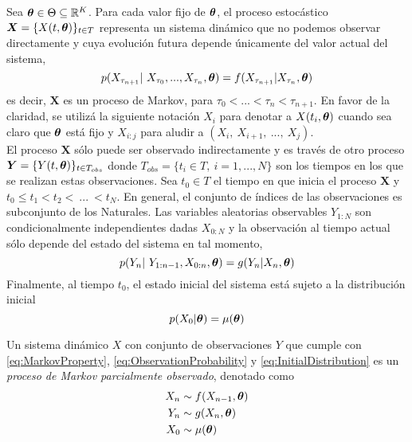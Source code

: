 Sea $\boldsymbol{\theta}\in\Theta\subseteq \mathbb R^K$. Para cada valor fijo de $\boldsymbol{\theta}$, el proceso estocástico $\boldsymbol{X} = \{X(t,\boldsymbol{\theta})\}_{t\in T}$ 
representa un sistema dinámico que no podemos observar directamente y cuya evolución futura depende únicamente del valor actual del sistema, 
\begin{equation}\label{eq:MarkovProperty}
    p(X_{\tau_{n+1}}|\ X_{\tau_0},...,X_{\tau_n},\boldsymbol{\theta}) = f(X_{\tau_{n+1}}|X_{\tau_n}, \boldsymbol{\theta})
\end{equation}
es decir, $\boldsymbol{X}$ es un proceso de Markov, para $\tau_0<...<\tau_n<\tau_{n+1}$. En favor de la claridad, se utilizá la siguiente notación $X_i$ para denotar a  $X(t_i, \boldsymbol{\theta})$ cuando sea claro que $\boldsymbol{\theta}$ está fijo 
y $X_{i:j}$ para aludir a $(X_i,\ X_{i+1},\ ...,\ X_j)$.\\

El proceso $\boldsymbol{X}$ sólo puede ser observado indirectamente y es través de otro proceso $\boldsymbol{Y} = \{Y(t, \boldsymbol{\theta})\}_{t\in T_{obs}}$ donde $T_{obs}=\{t_i\in 
T,\ i=1,...,N\}$ son los tiempos en los que se realizan estas observaciones. Sea $t_0\in T$ el tiempo en que inicia el proceso $\boldsymbol{X}$ y $t_0\leq t_1 < t_2 <\ ...\ <t_{N}$. En general, el conjunto de índices de las observaciones es subconjunto de los Naturales. Las variables aleatorias observables $Y_{1:N}$ son condicionalmente independientes dadas $X_{0:N}$ y la observación al tiempo actual sólo depende del estado del sistema en tal momento,
\begin{equation}\label{eq:ObservationProbability}
    p(Y_{n}|\ Y_{1:n-1}, X_{0:n}, \boldsymbol{\theta}) = g(Y_n| X_n, \boldsymbol{\theta}) 
\end{equation}
Finalmente, al tiempo $t_0$, el estado inicial del sistema está sujeto a la distribución inicial
\begin{equation}\label{eq:InitialDistribution}
    p(X_{0}|\boldsymbol{\theta}) = \mu(\boldsymbol{\theta})
\end{equation}

\begin{definition}
    Un sistema dinámico $X$ con conjunto de observaciones $Y$ que cumple con \ref{eq:MarkovProperty}, 
    \ref{eq:ObservationProbability} y \ref{eq:InitialDistribution} es un 
    \textit{proceso de Markov parcialmente observado}, denotado como 
    \begin{align}\label{eq:POMP}
       \begin{split}
        X_{n}&\sim f(X_{n-1},\boldsymbol{\theta})\\
        Y_{n}&\sim g(X_n,\boldsymbol{\theta})\\
        X_0&\sim\mu(\boldsymbol{\theta})
    \end{split} 
    \end{align}
\end{definition}

